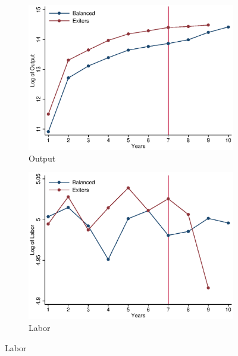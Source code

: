 \documentclass[11pt]{article}
\begin{document}
\begin{figure}[ht]
	\caption{Time series by samples}\label{fig:time}
	\centering	
	\begin{subfigure}[b]{.3\textwidth}
		\centering
		\caption{Output}
		\includegraphics[width=\textwidth]{timeY.eps}

	\end{subfigure}
	\begin{subfigure}[b]{.3\textwidth}
		\centering
		\caption{Labor}
		\includegraphics[width=\textwidth]{timeL.eps}


\end{subfigure}
\end{figure}
\end{document}
